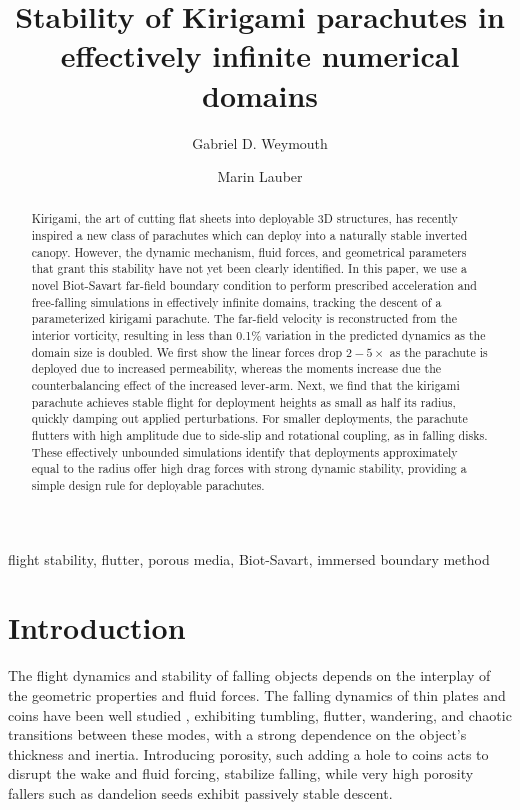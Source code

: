 \documentclass[lineno]{JFM-FLM_Au}
\title{Stability of Kirigami parachutes in effectively infinite numerical domains}
\author{Gabriel D. Weymouth\aff{1} \and Marin Lauber\aff{1}}
\affiliation{\aff{1}Faculty of Mechanical Engineering (ME), Delft University of Technology, Delft, Netherlands}
\begin{document}
\maketitle
\begin{abstract}
Kirigami, the art of cutting flat sheets into deployable 3D structures, has recently inspired a new class of parachutes which can deploy into a naturally stable inverted canopy. However, the dynamic mechanism, fluid forces, and geometrical parameters that grant this stability have not yet been clearly identified.
In this paper, we use a novel Biot-Savart far-field boundary condition to perform prescribed acceleration and free-falling simulations in effectively infinite domains, tracking the descent of a parameterized kirigami parachute. The far-field velocity is reconstructed from the interior vorticity, resulting in less than 0.1\% variation in the predicted dynamics as the domain size is doubled.
We first show the linear forces drop $2-5\times$ as the parachute is deployed due to increased permeability, whereas the moments increase due the counterbalancing effect of the increased lever-arm.
Next, we find that the kirigami parachute achieves stable flight for deployment heights as small as half its radius, quickly damping out applied perturbations. 
For smaller deployments, the parachute flutters with high amplitude due to side-slip and rotational coupling, as in falling disks.
These effectively unbounded simulations identify that deployments approximately equal to the radius offer high drag forces with strong dynamic stability, providing a simple design rule for deployable parachutes. 

\end{abstract}

\begin{keywords}
flight stability, flutter, porous media, Biot-Savart, immersed boundary method
\end{keywords}

\section{Introduction}\label{sec:intro}

The flight dynamics and stability of falling objects depends on the interplay of the geometric properties and fluid forces. The falling dynamics of thin plates and coins have been well studied \citep{Andersen2005UnsteadyPlates, Auguste2013FallingDisks}, exhibiting tumbling, flutter, wandering, and chaotic transitions between these modes, with a strong dependence on the object's thickness and inertia. Introducing porosity, such adding a hole to coins \citep{Vincent2016HolesCoins} acts to disrupt the wake and fluid forcing, stabilize falling, while very high porosity fallers such as dandelion seeds \citep{Cummins2018ADandelion,Bose2025PorousIncidence} exhibit passively stable descent.
\end{document}
